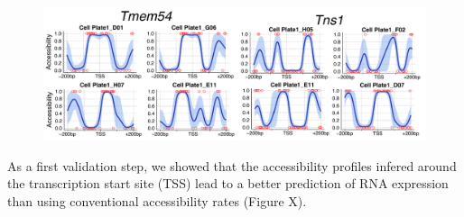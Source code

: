 \begin{figure}[H]
	\centering
	\includegraphics[width=0.9\linewidth]{scNMT_profiles_examples}
	\caption[]{}
	\label{fig:scnmt_profiles_examples}
\end{figure}


As a first validation step, we showed that the accessibility profiles infered around the transcription start site (TSS) lead to a better prediction of RNA expression than using conventional accessibility rates (Figure X).


